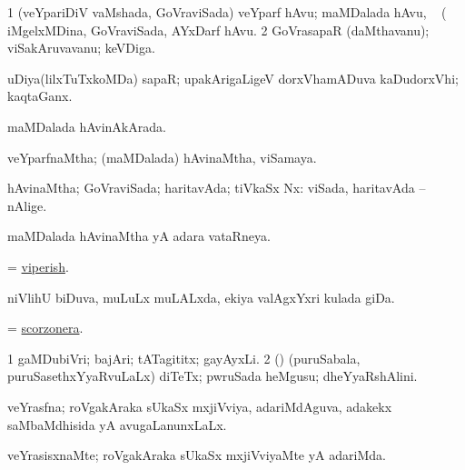 \bentry
{}
\gl{\saMkiSx}
\expl{}
\bmng
\emng
\eentry

\bentry
{} 
\gl{\nA}
\expl{}
\bmng
\bnum
\num{1} (veYpariDiV vaMshada, GoVraviSada) veYparf hAvu; maMDalada hAvu, \kanmu\  (  iMgelxMDina, GoVraviSada, AYxDarf hAvu. 
\num{2} GoVrasapaR (daMthavanu); viSakAruvavanu; keVDiga. 
\enum
\emng

\noindent 
\gl{\pagu}
\expl{}
\bmng
  uDiya(lilxTuTxkoMDa) sapaR; upakArigaLigeV dorxVhamADuva kaDudorxVhi; kaqtaGanx. 
\emng
\eentry

\bentry
{} 
\gl{\gu}
\expl{}
\bmng
 maMDalada hAvinAkArada. 
\emng
\eentry

\bentry
{} 
\gl{\gu}
\expl{}
\bmng
 veYparfnaMtha; (maMDalada) hAvinaMtha, viSamaya. 
\emng
\eentry

\bentry
{} 
\gl{\gu}
\expl{}
\bmng
 hAvinaMtha; GoVraviSada; haritavAda; tiVkaSx Nx:  viSada, haritavAda -- nAlige. 
\emng
\eentry

\bentry
{} 
\gl{\gu}
\expl{}
\bmng
 maMDalada hAvinaMtha yA adara vataRneya. 
\emng
\eentry

\bentry
{} 
\gl{\gu}
\expl{}
\bmng
 = \hyperlink{viperish}{viperish}. 
\emng
\eentry

\bentry
{} 
\gl{\nA}
\expl{}
\bmng
 niVlihU biDuva, muLuLx muLALxda, ekiya valAgxYxri kulada giDa. 
\emng
\eentry

\bentry
{}
\gl{\nA}
\expl{}
\bmng
 = \hyperref{kandict_s.pdf}{S}{scorzonera}{scorzonera}. 
\emng
\eentry

\bentry
{} 
\gl{\nA}
\bmng
\bnum
\num{1} gaMDubiVri; bajAri; tATagititx; gayAyxLi. 
\num{2} (\pArxparx) (puruSabala, puruSasethxYyaRvuLaLx) diTeTx; pwruSada heMgusu; dheYyaRshAlini. 
\enum
\emng
\eentry

\bentry
{} 
\gl{\gu}
\expl{}
\bmng
veYrasfna; roVgakAraka sUkaSx mxjiVviya, adariMdAguva, adakekx saMbaMdhisida yA avugaLanunxLaLx. 
\emng
\eentry

\bentry 
{} 
\gl{\kirxvi}
\expl{}
\bmng
 veYrasisxnaMte; roVgakAraka sUkaSx mxjiVviyaMte yA adariMda. 
\emng
\eentry

